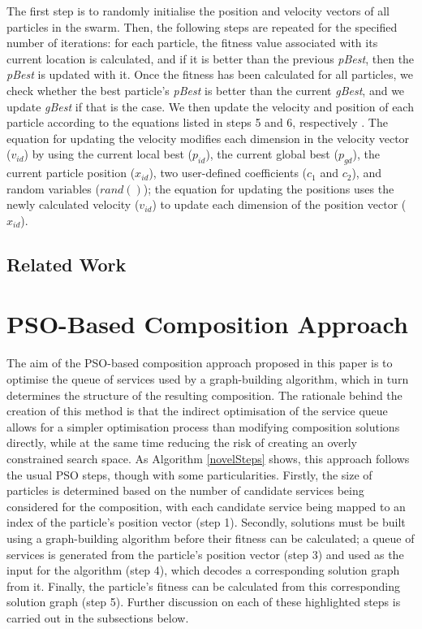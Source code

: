 \documentclass{llncs}
\begin{document}
The first step is to randomly initialise the position and velocity vectors of all particles in the swarm. Then, the following steps are repeated for the specified number of iterations: for each particle, the fitness value associated with its current location is calculated, and if it is better than the previous \textit{pBest}, then the \textit{pBest} is updated with it. Once the fitness has been calculated for all particles, we check whether the best particle's \textit{pBest} is better than the current \textit{gBest}, and we update \textit{gBest} if that is the case. We then update the velocity and position of each particle according to the equations listed in steps 5 and 6, respectively \cite{eberhart2001particle}. The equation for updating the velocity modifies each dimension in the velocity vector ($v_{id}$) by using the current local best ($p_{id}$), the current global best ($p_{gd}$), the current particle position ($x_{id}$), two user-defined coefficients ($c_1$ and $c_2$), and random variables ($rand()$); the equation for updating the positions uses the newly calculated velocity ($v_{id}$) to update each dimension of the position vector ($x_{id}$).

\subsection{Related Work}


\section{PSO-Based Composition Approach}\label{pso_approach}
The aim of the PSO-based composition approach proposed in this paper is to optimise the queue of services used by a graph-building algorithm, which in turn determines the structure of the resulting composition. The rationale behind the creation of this method is that the indirect optimisation of the service queue allows for a simpler optimisation process than modifying composition solutions directly, while at the same time reducing the risk of creating an overly constrained search space. As Algorithm \ref{novelSteps} shows, this approach follows the usual PSO steps, though with some particularities. Firstly, the size of particles is determined based on the number of candidate services being considered for the composition, with each candidate service being mapped to an index of the particle's position vector (step 1). Secondly, solutions must be built using a graph-building algorithm before their fitness can be calculated; a queue of services is generated from the particle's position vector (step 3) and used as the input for the algorithm (step 4), which decodes a corresponding solution graph from it. Finally, the particle's fitness can be calculated from this corresponding solution graph (step 5). Further discussion on each of these highlighted steps is carried out in the subsections below.
\end{document}
